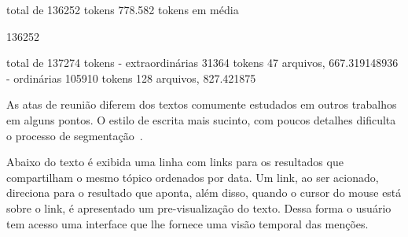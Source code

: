 total de 136252 tokens
778.582 tokens em média



136252

total de 137274 tokens
- extraordinárias  31364 tokens 47  arquivos, 667.319148936
- ordinárias      105910 tokens 128 arquivos, 827.421875

















As atas de reunião diferem dos textos comumente estudados em outros trabalhos em alguns pontos.
%
O estilo de escrita mais sucinto, com poucos detalhes dificulta o processo de segmentação~\cite{Choi2001-LSA}.
%
%
%











Abaixo do texto é exibida uma linha com links para os resultados que compartilham o mesmo tópico ordenados por data. Um link, ao ser acionado, direciona para o resultado que aponta, além disso, quando o cursor do mouse está sobre o link, é apresentado um pre-visualização do texto. Dessa forma o usuário tem acesso uma interface que lhe fornece uma visão temporal das menções.





